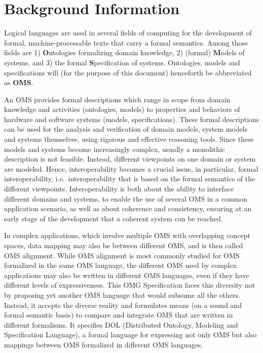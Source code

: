 \documentclass[10pt,%
\ifpretendfinal
final%
\else
draft%
\fi,
]{scrreprt}
\newcommand*{\IS}{OMG Specification\xspace}
\begin{document}
\section{Background Information}
Logical languages are used in several fields of computing for the development of formal,
 machine-processable texts that carry a formal semantics. Among those fields are 1) \textbf{O}ntologies 
 formalizing domain knowledge, 2) (formal) \textbf{M}odels of systems, and 3) the formal \textbf{S}pecification
  of systems. Ontologies, models  and specifications will (for the purpose of this document)
   henceforth be abbreviated as \textbf{OMS}.

An OMS provides formal descriptions which range in scope from domain knowledge and activities
(ontologies, models) to properties and behaviors of hardware and software systems (models,
specifications). These formal descriptions can be used for the analysis and verification of domain
models, system models and systems themselves, using rigorous and effective reasoning tools.  Since these
models and systems become increasingly complex, usually a monolithic description is not feasible.
Instead, different viewpoints on one domain or system are modeled.  Hence, interoperability becomes
a crucial issue, in particular, formal interoperability, i.e.\ interoperability that is based on
the formal semantics of the different viewpoints. Interoperability is both about the ability to 
interface different domains and systems, to enable the use of several OMS in a common application
scenario, as well as about coherence and consistency, ensuring at an early stage of the development
that a coherent system can be reached.

In complex applications, which involve multiple OMS with overlapping concept spaces,
data mapping may also be  between different OMS, and is then called OMS alignment. 
While OMS alignment is most commonly studied for OMS formalized in the same OMS 
language, the different OMS used by complex applications may also be written in different 
OMS languages, even if they have different levels of expressiveness. 
This \IS faces this diversity not by proposing yet another OMS language that would subsume all the others.  
Instead, it accepts the diverse reality and formulates means (on a sound and formal semantic basis) 
to compare and integrate OMS that are written in different formalisms.
It specifies DOL (Distributed Ontology, Modeling and Specification Language), a formal language for
expressing not only OMS but also mappings between OMS formalized in different OMS languages.
\end{document}
